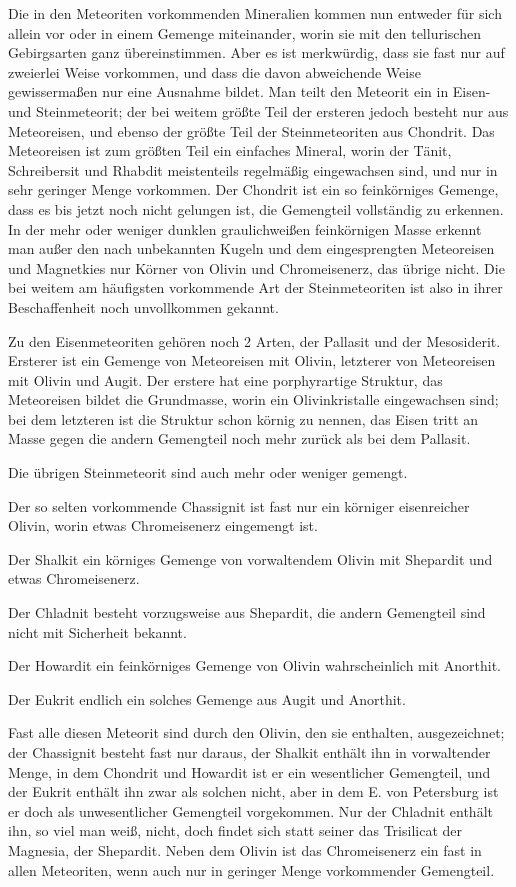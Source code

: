 \documentclass[a4paper, 11pt, oneside]{article}
\begin{document}
Die in den Meteoriten vorkommenden Mineralien kommen nun entweder für sich allein vor oder in einem Gemenge miteinander, worin sie mit den tellurischen Gebirgsarten ganz übereinstimmen. Aber es ist merkwürdig, dass sie fast nur auf zweierlei Weise vorkommen, und dass die davon abweichende Weise gewissermaßen nur eine Ausnahme bildet. Man teilt den Meteorit ein in Eisen- und Steinmeteorit; der bei weitem größte Teil der ersteren jedoch besteht nur aus Meteoreisen, und ebenso der größte Teil der Steinmeteoriten aus Chondrit. Das Meteoreisen ist zum größten Teil ein einfaches Mineral, worin der Tänit, Schreibersit und Rhabdit meistenteils regelmäßig eingewachsen sind, und nur in sehr geringer Menge vorkommen. Der Chondrit ist ein so feinkörniges Gemenge, dass es bis jetzt noch nicht gelungen ist, die Gemengteil vollständig zu erkennen. In der mehr oder weniger dunklen graulichweißen feinkörnigen Masse erkennt man außer den nach unbekannten Kugeln und dem eingesprengten Meteoreisen und Magnetkies nur Körner von Olivin und Chromeisenerz, das übrige nicht. Die bei weitem am häufigsten vorkommende Art der Steinmeteoriten ist also in ihrer Beschaffenheit noch unvollkommen gekannt.

Zu den Eisenmeteoriten gehören noch 2 Arten, der Pallasit und der Mesosiderit. Ersterer ist ein Gemenge von Meteoreisen mit Olivin, letzterer von Meteoreisen mit Olivin und Augit. Der erstere hat eine porphyrartige Struktur, das Meteoreisen bildet die Grundmasse, worin ein Olivinkristalle eingewachsen sind; bei dem letzteren ist die Struktur schon körnig zu nennen, das Eisen tritt an Masse gegen die andern Gemengteil noch mehr zurück als bei dem Pallasit.

Die übrigen Steinmeteorit sind auch mehr oder weniger gemengt.

Der so selten vorkommende Chassignit ist fast nur ein körniger eisenreicher Olivin, worin etwas Chromeisenerz eingemengt ist.

Der Shalkit ein körniges Gemenge von vorwaltendem Olivin mit Shepardit und etwas Chromeisenerz.

Der Chladnit besteht vorzugsweise aus Shepardit, die andern Gemengteil sind nicht mit Sicherheit bekannt.

Der Howardit ein feinkörniges Gemenge von Olivin wahrscheinlich mit Anorthit.

Der Eukrit endlich ein solches Gemenge aus Augit und Anorthit.

Fast alle diesen Meteorit sind durch den Olivin, den sie enthalten, ausgezeichnet; der Chassignit besteht fast nur daraus, der Shalkit enthält ihn in vorwaltender Menge, in dem Chondrit und Howardit ist er ein wesentlicher Gemengteil, und der Eukrit enthält ihn zwar als solchen nicht, aber in dem E. von Petersburg ist er doch als unwesentlicher Gemengteil vorgekommen. Nur der Chladnit enthält ihn, so viel man weiß, nicht, doch findet sich statt seiner das Trisilicat der Magnesia, der Shepardit. Neben dem Olivin ist das Chromeisenerz ein fast in allen Meteoriten, wenn auch nur in geringer Menge vorkommender Gemengteil.
\end{document}
